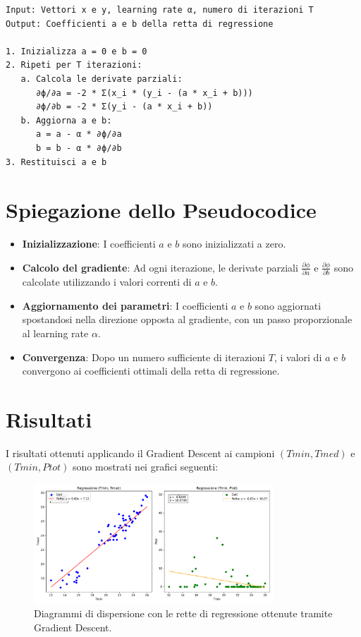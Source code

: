 \documentclass{article}
\begin{document}
\begin{verbatim}
Input: Vettori x e y, learning rate α, numero di iterazioni T
Output: Coefficienti a e b della retta di regressione

1. Inizializza a = 0 e b = 0
2. Ripeti per T iterazioni:
   a. Calcola le derivate parziali:
      ∂ϕ/∂a = -2 * Σ(x_i * (y_i - (a * x_i + b)))
      ∂ϕ/∂b = -2 * Σ(y_i - (a * x_i + b))
   b. Aggiorna a e b:
      a = a - α * ∂ϕ/∂a
      b = b - α * ∂ϕ/∂b
3. Restituisci a e b
\end{verbatim}

\section{Spiegazione dello Pseudocodice}
\begin{itemize}
    \item \textbf{Inizializzazione}: I coefficienti \(a\) e \(b\) sono inizializzati a zero.
    \item \textbf{Calcolo del gradiente}: Ad ogni iterazione, le derivate parziali \(\frac{\partial \phi}{\partial a}\) e \(\frac{\partial \phi}{\partial b}\) sono calcolate utilizzando i valori correnti di \(a\) e \(b\).
    \item \textbf{Aggiornamento dei parametri}: I coefficienti \(a\) e \(b\) sono aggiornati spostandosi nella direzione opposta al gradiente, con un passo proporzionale al learning rate \(\alpha\).
    \item \textbf{Convergenza}: Dopo un numero sufficiente di iterazioni \(T\), i valori di \(a\) e \(b\) convergono ai coefficienti ottimali della retta di regressione.
\end{itemize}

\section{Risultati}
I risultati ottenuti applicando il Gradient Descent ai campioni \((Tmin, Tmed)\) e \((Tmin, Ptot)\) sono mostrati nei grafici seguenti:

\begin{figure}[H]
    \centering
    \includegraphics[width=0.8\textwidth]{gradient_descent_regression_plots.pdf}
    \caption{Diagrammi di dispersione con le rette di regressione ottenute tramite Gradient Descent.}
\end{figure}
\end{document}
